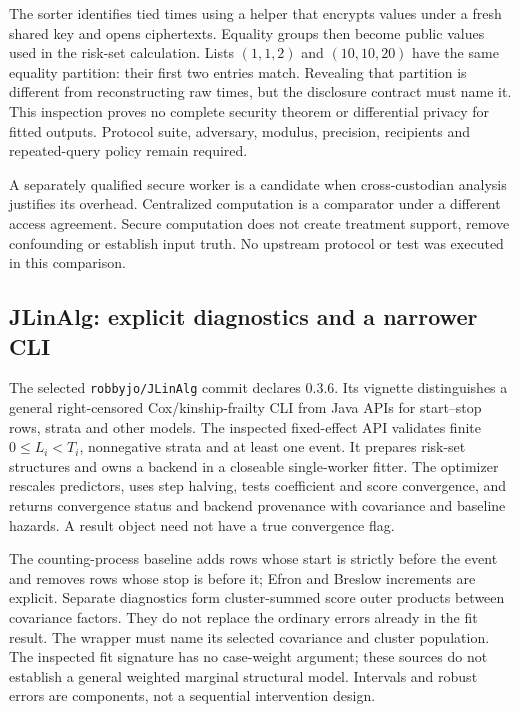The sorter identifies tied times using a helper that encrypts values under
a fresh shared key and opens ciphertexts. Equality groups then become public
values used in the risk-set calculation. Lists $(1,1,2)$ and $(10,10,20)$
have the same equality partition: their first two entries match. Revealing
that partition is different from reconstructing raw times, but the disclosure
contract must name it. This inspection proves no complete security theorem
or differential privacy for fitted outputs. Protocol suite, adversary,
modulus, precision, recipients and repeated-query policy remain required.
\citep{exec24_longjava_fresco,exec24_longjava_reference}

A separately qualified secure worker is a candidate when cross-custodian
analysis justifies its overhead. Centralized computation is a comparator
under a different access agreement. Secure computation does not create
treatment support, remove confounding or establish input truth. No upstream
protocol or test was executed in this comparison.
\citep{exec24_longjava_fresco}

\subsection{JLinAlg: explicit diagnostics and a narrower CLI}
The selected \texttt{robbyjo/JLinAlg} commit declares 0.3.6. Its vignette
distinguishes a general right-censored Cox/kinship-frailty CLI from Java APIs
for start--stop rows, strata and other models. The inspected fixed-effect API
validates finite $0\leq L_i<T_i$, nonnegative strata and at least one event.
It prepares risk-set structures and owns a backend in a closeable single-worker
fitter. The optimizer rescales predictors, uses step halving, tests coefficient
and score convergence, and returns convergence status and backend provenance
with covariance and baseline hazards. A result object need not have a true
convergence flag. \citep{exec24_longjava_jlinalg}

The counting-process baseline adds rows whose start is strictly before the
event and removes rows whose stop is before it; Efron and Breslow increments
are explicit. Separate diagnostics form cluster-summed score outer products
between covariance factors. They do not replace the ordinary errors already
in the fit result. The wrapper must name its selected covariance and cluster
population. The inspected fit signature has no case-weight argument; these
sources do not establish a general weighted marginal structural model.
Intervals and robust errors are components, not a sequential intervention
design. \citep{exec24_longjava_jlinalg}

